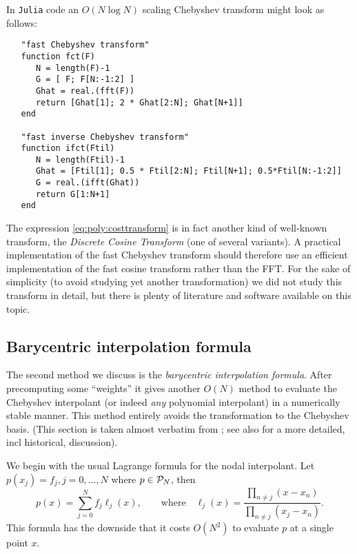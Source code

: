 In {\tt Julia} code an $O(N\log N)$ scaling Chebyshev transform might 
look as follows: 

\begin{verbatim}
   "fast Chebyshev transform"
   function fct(F)
      N = length(F)-1
      G = [ F; F[N:-1:2] ]
      Ghat = real.(fft(F))
      return [Ghat[1]; 2 * Ghat[2:N]; Ghat[N+1]]
   end 

   "fast inverse Chebyshev transform"
   function ifct(Ftil)
      N = length(Ftil)-1
      Ghat = [Ftil[1]; 0.5 * Ftil[2:N]; Ftil[N+1]; 0.5*Ftil[N:-1:2]]
      G = real.(ifft(Ghat))
      return G[1:N+1]
   end
\end{verbatim}


\begin{remark}
   The expression \eqref{eq:poly:costtransform} is in fact another kind of 
   well-known transform, the {\em Discrete Cosine Transform} (one of several 
   variants). A practical implementation of the fast Chebyshev transform 
   should therefore use an efficient implementation of the fast cosine transform 
   rather than the FFT.
   For the sake  of simplicity (to avoid studying yet another transformation) 
   we did not study this transform in detail, but there is plenty of literature 
   and software available on this topic. 
\end{remark}



\subsection{Barycentric interpolation formula}
%
\label{sec:poly:bary}
%
The second method we discuss is the {\em barycentric interpolation formula}.
After precomputing some ``weights'' it gives another $O(N)$ method to evaluate
the Chebyshev interpolant (or indeed {\em any} polynomial interpolant) in a
numerically stable manner. This method entirely avoids the transformation to the
Chebyshev basis. (This section is taken almost verbatim from
\cite{Trefethen2013-rg}; see also \cite[Ch. 5]{Trefethen2013-rg} for a more
detailed, incl historical, discussion).

We begin with the usual Lagrange formula for the nodal interpolant. 
Let $p(x_j) = f_j, j = 0, \dots, N$ where $p \in \mathcal{P}_N$, then  
\[
   p(x) = \sum_{j = 0}^N f_j \ell_j(x), 
   \qquad \text{where} \quad 
   \ell_j(x) = \frac{ \prod_{n \neq j} (x - x_n)}{\prod_{n \neq j} (x_j-x_n)}.
\]
This formula has the downside that it costs $O(N^2)$ to evaluate $p$ at a 
single point $x$. 


